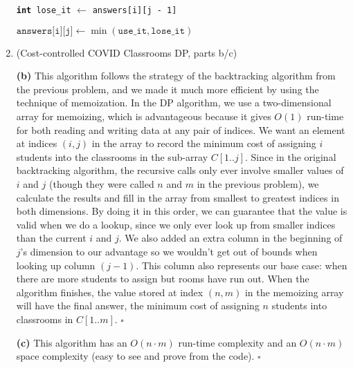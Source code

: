 \documentclass{article}
\begin{document}
\begin{enumerate}
\begin{center}
\begin{minipage}{0.875\linewidth}
\begin{algorithm}[H]
{{              \texttt{\textbf{int} lose\_it} $\gets$ \texttt{answers[i][j - 1]}

              $\texttt{answers[i][j]} \gets \min(\texttt{use\_it}, \texttt{lose\_it})$
            }
          }

        \end{algorithm}
      \end{minipage}
    \end{center}

    \pagebreak

    \setcounter{enumi}{4} %
  \item (Cost-controlled COVID Classrooms DP, parts b/c)

    \textbf{(b)} This algorithm follows the strategy of the backtracking algorithm from the previous problem, and we made it much more efficient by using the technique of memoization. In the DP algorithm, we use a two-dimensional array for memoizing, which is advantageous because it gives $O(1)$ run-time for both reading and writing data at any pair of indices. We want an element at indices $(i, j)$ in the array to record the minimum cost of assigning $i$ students into the classrooms in the sub-array $C[1..j]$. Since in the original backtracking algorithm, the recursive calls only ever involve smaller values of $i$ and $j$ (though they were called $n$ and $m$ in the previous problem), we calculate the results and fill in the array from smallest to greatest indices in both dimensions. By doing it in this order, we can guarantee that the value is valid when we do a lookup, since we only ever look up from smaller indices than the current $i$ and $j$. We also added an extra column in the beginning of $j$'s dimension to our advantage so we wouldn't get out of bounds when looking up column $(j-1)$. This column also represents our base case: when there are more students to assign but rooms have run out. When the algorithm finishes, the value stored at index $(n, m)$ in the memoizing array will have the final answer, the minimum cost of assigning $n$ students into classrooms in $C[1..m]$. $\square$

    \textbf{(c)} This algorithm has an $O(n \cdot m)$ run-time complexity and an $O(n \cdot m)$ space complexity (easy to see and prove from the code). $\square$

\end{enumerate}
\end{document}

